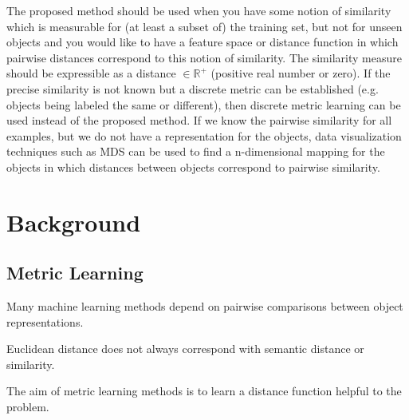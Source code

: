 \documentclass[a4paper,titlepage]{article}
\begin{document}
The proposed method should be used when you have some notion of similarity which is measurable for (at least a subset of) the training set, but not for unseen objects and you would like to have a feature space or distance function in which pairwise distances correspond to this notion of similarity. The similarity measure should be expressible as a distance $\in \mathbb{R}^{+}$ (positive real number or zero). If the precise similarity is not known but a discrete metric can be established (e.g. objects being labeled the same or different), then discrete metric learning can be used instead of the proposed method. If we know the pairwise similarity for all examples, but we do not have a representation for the objects, data visualization techniques such as \ac{MDS} can be used to find a n-dimensional mapping for the objects in which distances between objects correspond to pairwise similarity.








%

\pagebreak
\section{Background}

\subsection{Metric Learning}
\label{sec:metric_learning}

Many machine learning methods depend on pairwise comparisons between object representations. 

Euclidean distance does not always correspond with semantic distance or similarity.

The aim of metric learning methods is to learn a distance function helpful to the problem.
\end{document}
